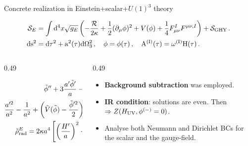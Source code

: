 \documentclass[aspectratio=169,smaller]{beamer}%
\begin{document}
\begin{frame}{Concrete realization in Einstein+scalar+$U(1)^3$ theory}
	\begin{block}{}
	\begin{equation*}
	\begin{aligned}
		\mathcal{S}_E &= \int {\rm d}^4x \sqrt{g_E} \left(-\frac{\mathcal{R}}{2\kappa} + \frac12 (\partial_\mu\phi)^2 +V(\phi) + \frac{1}{4}F_{\mu \nu}^{I} F^{\mu \nu, I} \right)+\mathcal{S}_{\rm GHY}\,.\\
    \rm{d}s^2 &= \rm{d}\tau^2 + a^2(\tau) \rm{d}\Omega_3^2\,, \quad \phi = \phi(\tau)\,, \quad A^{(I)}(\tau) = \omega^{(I)} H(\tau)\,.
	\end{aligned}
	\end{equation*}
	\end{block}
	\begin{columns}
		\begin{column}{0.49\textwidth}
			\begin{block}{}
		\begin{align*}
\tilde{\phi}''+3\frac{a'\tilde{\phi}'}{a}-\frac{{\rm d}\tilde{V}(\tilde{\phi})}{{\rm d} \tilde{\phi}} &= 0\,, 
\\
\frac{a'^2}{a^2} -\frac{1}{a^2}  + \left(\tilde{V}(\tilde{\phi})-\frac{\tilde{\phi}'^2}{2} \right) - \frac{\tilde{\rho}^E_{\rm rad}}{a^4} & =0 \,,
\\
\tilde{\rho}^E_{\rm rad} = 2\kappa a^4 \left[ \left(\frac{H'}{a} \right)^2 - \frac{4H^2}{a^4} \right] &= 0 \,
\,.
\label{eq:eoms_Eucl}
\end{align*}
	\end{block}
		\end{column}
		\begin{column}{0.49\textwidth}
			\begin{block}{}
				\begin{itemize}
					\item \textbf{Background subtraction} was employed.
					\item \textbf{IR condition}:  solutions are even. Then $\Rightarrow Z(H_{\rm UV},\phi^{(-)}=0)$.
					\item Analyse both Neumann and Dirichlet BCs for the scalar and the gauge-field.
				\end{itemize}
			\end{block}
		\end{column}
	\end{columns}
	

\end{frame}
\end{document}
